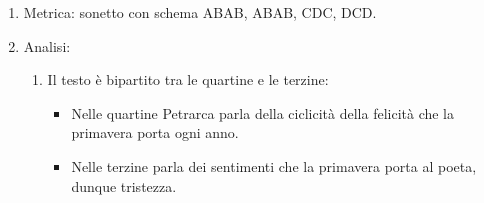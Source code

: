 \documentclass{article}
\begin{document}
\begin{enumerate}
    \item Metrica: sonetto con schema ABAB, ABAB, CDC, DCD.

    \item Analisi:
        \begin{enumerate}[label=]
            \item Il testo è bipartito tra le quartine e le terzine:
                \begin{itemize}
                    \item Nelle quartine Petrarca parla della ciclicità della felicità che la primavera porta ogni anno.
                    \item Nelle terzine parla dei sentimenti che la primavera porta al poeta, dunque tristezza.
                \end{itemize}
        \end{enumerate}


\end{enumerate}
\end{document}
